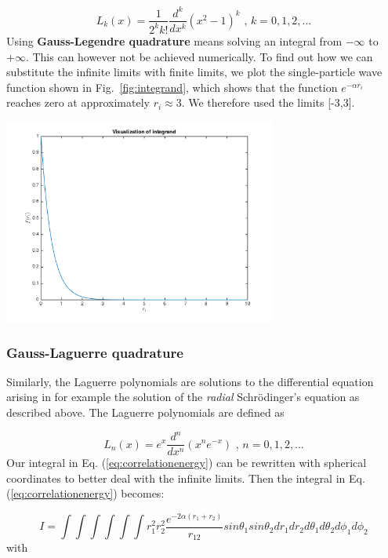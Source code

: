 \documentclass{article}
\begin{document}
\begin{equation}
	L_k(x) = \frac{1}{2^k k!} \frac{d^k}{dx^k} (x^2 - 1)^k \textrm{ , } k = 0,1,2, \dots
\end{equation}
Using \textbf{Gauss-Legendre quadrature} means solving an integral from $- \infty$ to $+ \infty$. This can however not be achieved numerically. To find out how we can substitute the infinite limits with finite limits, we plot the single-particle wave function shown in Fig.~\ref{fig:integrand}, which shows that the function $e^{-\alpha r_i}$ reaches zero at approximately $r_i \approx 3$. We therefore used the limits [-3,3].

\begin{center}
	\includegraphics[width=90mm]{integrand.png} 	
	\label{fig:integrand}
\end{center}



\subsubsection{Gauss-Laguerre quadrature}
Similarly, the Laguerre polynomials are solutions to the differential equation arising in for example the solution of the \textit{radial} Schr\"{o}dinger's equation as described above. The Laguerre polynomials are defined as

\begin{equation}
	L_n(x) = e^x \frac{d^n}{dx^n} (x^n e^{-x}) \textrm{ , } n = 0,1,2, \dots
\end{equation}
Our integral in Eq. (\ref{eq:correlationenergy}) can be rewritten with spherical coordinates to better deal with the infinite limits. Then the integral in Eq. (\ref{eq:correlationenergy}) becomes:

\begin{equation}
	I = \int \int \int \int  \int \int    r_1^2 r_2^2 \frac{e^{- 2 \alpha (r_1 + r_2)}}{r_{12}} sin \theta_1 sin \theta_2 dr_1  dr_2 d\theta_1 d\theta_2 d\phi_1d\phi_2
\end{equation}
with
\end{document}
